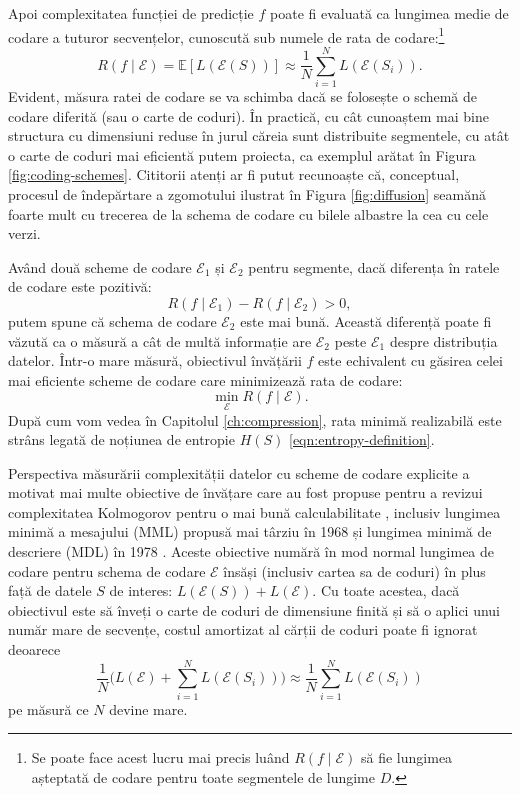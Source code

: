 \documentclass[../../book-main_ro.tex]{subfiles}
\begin{document}
Apoi complexitatea funcției de predicție $f$ poate fi evaluată ca lungimea medie de codare a tuturor secvențelor, cunoscută sub numele de rata de codare:\footnote{Se poate face acest lucru mai precis luând $R(f\mid \mathcal{E})$ să fie lungimea așteptată de codare pentru toate segmentele de lungime $D$. }
\begin{equation}
   R(f \mid \mathcal E) = \mathbb{E}[L(\mathcal{E}(S))] \approx \frac{1}{N}\sum_{i=1}^N L(\mathcal{E}(S_i)).
   \label{eqn:coding-rate}
\end{equation}
Evident, măsura ratei de codare se va schimba dacă se folosește o schemă de codare diferită (sau o carte de coduri). În practică, cu cât cunoaștem mai bine structura cu dimensiuni reduse în jurul căreia sunt distribuite segmentele, cu atât o carte de coduri mai eficientă putem proiecta, ca exemplul arătat în Figura \ref{fig:coding-schemes}. Cititorii atenți ar fi putut recunoaște că, conceptual, procesul de îndepărtare a zgomotului ilustrat în Figura \ref{fig:diffusion} seamănă foarte mult cu trecerea de la schema de codare cu bilele albastre la cea cu cele verzi.


Având două scheme de codare $\mathcal{E}_1$ și $\mathcal{E}_2$ pentru segmente, dacă diferența în ratele de codare este pozitivă:
\begin{equation}
   R(f \mid \mathcal E_1) -  R(f \mid \mathcal E_2) > 0,
\end{equation}
putem spune că schema de codare $\mathcal{E}_2$ este mai bună. Această diferență poate fi văzută ca o măsură a cât de multă informație are $\mathcal{E}_2$ peste $\mathcal{E}_1$ despre distribuția datelor. Într-o mare măsură, obiectivul învățării $f$ este echivalent cu găsirea celei mai eficiente scheme de codare care minimizează rata de codare:
\begin{equation}
   \min_{\mathcal{E}} R(f \mid \mathcal E).
\end{equation}
După cum vom vedea în Capitolul \ref{ch:compression}, rata minimă realizabilă este strâns legată de noțiunea de entropie $H(S)$ \eqref{eqn:entropy-definition}.


\begin{remark}\label{rem:computable-complexity}
    {Perspectiva măsurării complexității datelor cu scheme de codare explicite a motivat mai multe obiective de învățare care au fost propuse pentru a revizui complexitatea Kolmogorov pentru o mai bună calculabilitate \cite{WallaceC1999}, inclusiv lungimea minimă a mesajului (MML) propusă mai târziu în 1968 \cite{WallaceC1968} și lungimea minimă de descriere (MDL) în 1978 \cite{Rissanen-1978,HansenM2001}. Aceste obiective numără în mod normal lungimea de codare pentru schema de codare $\mathcal{E}$ însăși (inclusiv cartea sa de coduri) în plus față de datele $S$ de interes: $L(\mathcal E(S)) + L(\mathcal E)$. Cu toate acestea, dacă obiectivul este să înveți o carte de coduri de dimensiune finită și să o aplici unui număr mare de secvențe, costul amortizat al cărții de coduri poate fi ignorat deoarece $$\frac{1}{N}\Big( L(\mathcal{E}) + \sum_{i=1}^N L(\mathcal{E}(S_i))\Big) \approx \frac{1}{N}\sum_{i=1}^N L(\mathcal{E}(S_i))$$ pe măsură ce $N$ devine mare.}
\end{remark}
\end{document}
